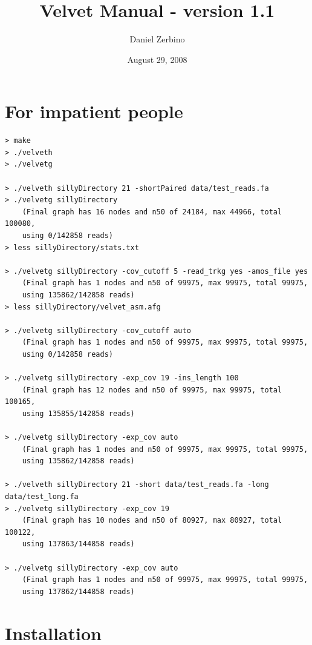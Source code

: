 \documentclass{article}
\begin{document}
\title{Velvet Manual - version 1.1}
\author{Daniel Zerbino}
\date{August 29, 2008}


\maketitle

\tableofcontents

\newpage

\section{For impatient people}

\begin{verbatim}
> make
> ./velveth
> ./velvetg

> ./velveth sillyDirectory 21 -shortPaired data/test_reads.fa
> ./velvetg sillyDirectory
	(Final graph has 16 nodes and n50 of 24184, max 44966, total 100080, 
	using 0/142858 reads)
> less sillyDirectory/stats.txt

> ./velvetg sillyDirectory -cov_cutoff 5 -read_trkg yes -amos_file yes
	(Final graph has 1 nodes and n50 of 99975, max 99975, total 99975, 
	using 135862/142858 reads)
> less sillyDirectory/velvet_asm.afg

> ./velvetg sillyDirectory -cov_cutoff auto
	(Final graph has 1 nodes and n50 of 99975, max 99975, total 99975, 
	using 0/142858 reads)

> ./velvetg sillyDirectory -exp_cov 19 -ins_length 100
	(Final graph has 12 nodes and n50 of 99975, max 99975, total 100165, 
	using 135855/142858 reads)
	
> ./velvetg sillyDirectory -exp_cov auto
	(Final graph has 1 nodes and n50 of 99975, max 99975, total 99975, 
	using 135862/142858 reads)

> ./velveth sillyDirectory 21 -short data/test_reads.fa -long data/test_long.fa
> ./velvetg sillyDirectory -exp_cov 19
	(Final graph has 10 nodes and n50 of 80927, max 80927, total 100122, 
	using 137863/144858 reads)
	
> ./velvetg sillyDirectory -exp_cov auto
	(Final graph has 1 nodes and n50 of 99975, max 99975, total 99975, 
	using 137862/144858 reads)

\end{verbatim}

\section{Installation}
\end{document}
